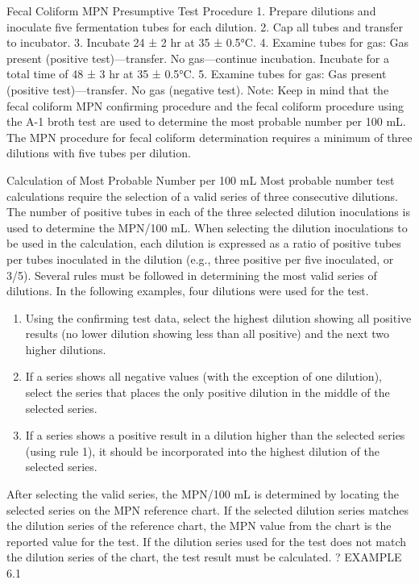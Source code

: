 \documentclass{article}
\begin{document}
Fecal Coliform MPN Presumptive Test Procedure 1. Prepare dilutions and
inoculate five fermentation tubes for each dilution. 2. Cap all tubes
and transfer to incubator. 3. Incubate 24 ± 2 hr at 35 ± 0.5°C. 4.
Examine tubes for gas: Gas present (positive test)---transfer. No
gas---continue incubation. Incubate for a total time of 48 ± 3 hr at 35
± 0.5°C. 5. Examine tubes for gas: Gas present (positive
test)---transfer. No gas (negative test). Note: Keep in mind that the
fecal coliform MPN confirming procedure and the fecal coliform procedure
using the A-1 broth test are used to determine the most probable number
per 100 mL. The MPN procedure for fecal coliform determination requires
a minimum of three dilutions with five tubes per dilution.

Calculation of Most Probable Number per 100 mL Most probable number test
calculations require the selection of a valid series of three
consecutive dilutions. The number of positive tubes in each of the three
selected dilution inoculations is used to determine the MPN/100 mL. When
selecting the dilution inoculations to be used in the calculation, each
dilution is expressed as a ratio of positive tubes per tubes inoculated
in the dilution (e.g., three positive per five inoculated, or 3/5).
Several rules must be followed in determining the most valid series of
dilutions. In the following examples, four dilutions were used for the
test.

\begin{enumerate}

\item
  Using the confirming test data, select the highest dilution showing
  all positive results (no lower dilution showing less than all
  positive) and the next two higher dilutions.
\item
  If a series shows all negative values (with the exception of one
  dilution), select the series that places the only positive dilution in
  the middle of the selected series.
\item
  If a series shows a positive result in a dilution higher than the
  selected series (using rule 1), it should be incorporated into the
  highest dilution of the selected series.
\end{enumerate}

After selecting the valid series, the MPN/100 mL is determined by
locating the selected series on the MPN reference chart. If the selected
dilution series matches the dilution series of the reference chart, the
MPN value from the chart is the reported value for the test. If the
dilution series used for the test does not match the dilution series of
the chart, the test result must be calculated. ? EXAMPLE 6.1
\end{document}
